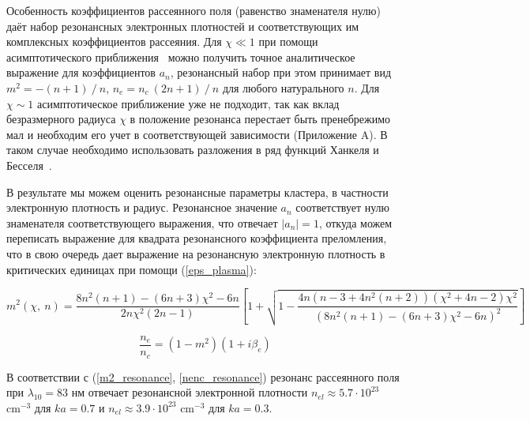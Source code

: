 
Особенность коэффициентов рассеянного поля (равенство знаменателя нулю) даёт набор резонансных электронных плотностей и соответствующих им комплексных коэффициентов рассеяния. Для $\chi \ll 1$ при помощи асимптотического приближения~\cite{andreev_lecz} можно получить точное аналитическое выражение для коэффициентов $a_n$, резонансный набор при этом принимает вид $m^2 = - (n + 1)\:/\:n$, $n_e = n_c\:(2n + 1)\:/\:n$ для любого натурального $n$. Для $\chi \sim 1$ асимптотическое приближение уже не подходит, так как вклад безразмерного радиуса $\chi$ в положение резонанса перестает быть пренебрежимо мал и необходим его учет в соответствующей зависимости (Приложение A). В таком случае необходимо использовать разложения в ряд функций Ханкеля и Бесселя~\cite{boren_huffman}.

В результате мы можем оценить резонансные параметры кластера, в частности электронную плотность и радиус. Резонансное значение $a_n$ соответствует нулю знаменателя соответствующего выражения, что отвечает $|a_n| = 1$, откуда можем переписать выражение для квадрата резонансного коэффициента преломления, что в свою очередь дает выражение на резонансную электронную плотность в критических единицах при помощи (\ref{eps_plasma}):

    \begin{equation}
        m^2 \left(\chi,\:n \right) = \frac{8n^2 (n + 1) - (6n + 3)\chi^2 - 6n}{2n \chi^2 (2n-1)} \left[ 1 + \sqrt{ 1 - \frac{4n (n-3 + 4n^2 (n + 2)) (\chi^2 + 4n-2) \chi^2}{{\left(8n^2 (n + 1) - (6n + 3)\chi^2 - 6n \right)}^{2}} } \right]
        \label{m2_resonance}
    \end{equation}

    \begin{equation}
        \frac{n_e}{n_c} = (1 - m^2) (1 + i \beta_e)
        \label{nenc_resonance}
    \end{equation}


В соответствии с (\ref{m2_resonance}, \ref{nenc_resonance}) резонанс рассеянного поля при $\lambda_{10} = 83$ нм отвечает резонансной электронной плотности $n_{el} \approx 5.7 \cdot 10^{23}$ $\textrm{cm}^{-3}$ для $ka = 0.7$ и $n_{el} \approx 3.9 \cdot 10^{23}$ $\textrm{cm}^{-3}$ для $ka = 0.3$.